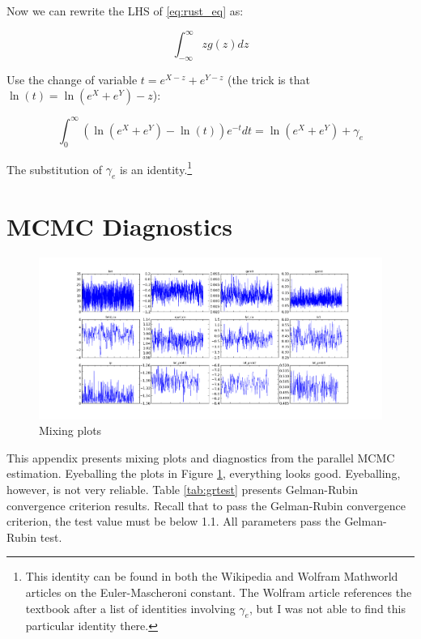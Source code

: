 Now we can rewrite the LHS of \eqref{eq:rust_eq} as:

\begin{equation}
    \int_{-\infty}^\infty z g(z) dz 
\end{equation}

Use the change of variable $t = e^{X - z} + e^{Y - z}$ (the trick is that $\ln(t) = \ln\left(e^X + e^Y\right) - z$):

\begin{equation}
    \int_{0}^\infty \left(\ln \left(e^X + e^Y\right) - \ln(t)\right) e^{-t} dt = \ln \left(e^X + e^Y\right) + \gamma_e
\end{equation}

The substitution of $\gamma_e$ is an identity.\footnote{This identity can be found in both the Wikipedia and Wolfram Mathworld articles on the Euler-Mascheroni constant.  The Wolfram article references the textbook \citet{whittaker1996course} after a list of identities involving $\gamma_e$, but I was not able to find this particular identity there.}

\clearpage
\section{MCMC Diagnostics}
\label{sec:MCMC_diag}

\begin{figure}[!ht]
    \includegraphics[scale=0.35]{pics/params_plots_big.png}
    \caption{Mixing plots}
    \label{fig:mix}
\end{figure}

This appendix presents mixing plots and diagnostics from the parallel
MCMC estimation. Eyeballing the plots in Figure \ref{fig:mix}, everything looks good.  Eyeballing,
however, is not very reliable.
Table \ref{tab:grtest} presents Gelman-Rubin convergence criterion results. Recall that to pass the
Gelman-Rubin convergence criterion, the test value must be below 1.1.
All parameters pass the Gelman-Rubin test.

